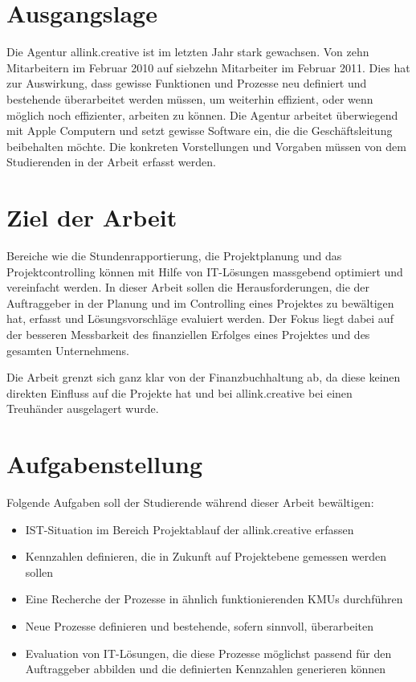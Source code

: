 \section{Ausgangslage}
Die Agentur allink.creative ist im letzten Jahr stark gewachsen. Von zehn
Mitarbeitern im Februar 2010 auf siebzehn Mitarbeiter im Februar 2011. Dies hat 
zur Auswirkung, dass gewisse Funktionen und Prozesse neu definiert und bestehende
überarbeitet werden müssen, um weiterhin effizient, oder wenn möglich noch 
effizienter, arbeiten zu können. Die Agentur arbeitet überwiegend mit Apple
Computern und setzt gewisse Software ein, die die Geschäftsleitung beibehalten 
möchte. Die konkreten Vorstellungen und Vorgaben müssen von dem Studierenden
in der Arbeit erfasst werden.

\section{Ziel der Arbeit}
Bereiche wie die Stundenrapportierung, die Projektplanung und das Projektcontrolling 
können mit Hilfe von IT-Lösungen massgebend optimiert und vereinfacht werden. 
In dieser Arbeit sollen die Herausforderungen, die der Auftraggeber in der 
Planung und im Controlling eines Projektes zu bewältigen hat, erfasst und 
Lösungsvorschläge evaluiert werden. Der Fokus liegt dabei auf der besseren 
Messbarkeit des finanziellen Erfolges eines Projektes und des gesamten 
Unternehmens.

Die Arbeit grenzt sich ganz klar von der Finanzbuchhaltung ab, da
diese keinen direkten Einfluss auf die Projekte hat und bei allink.creative 
bei einen Treuhänder ausgelagert wurde.

\section{Aufgabenstellung}
Folgende Aufgaben soll der Studierende während dieser Arbeit bewältigen:

\begin{itemize}
    \item IST-Situation im Bereich Projektablauf der allink.creative erfassen
    \item Kennzahlen definieren, die in Zukunft auf Projektebene gemessen 
        werden sollen
    \item Eine Recherche der Prozesse in ähnlich funktionierenden KMUs durchführen
    \item Neue Prozesse definieren und bestehende, sofern sinnvoll, überarbeiten
    \item Evaluation von IT-Lösungen, die diese Prozesse möglichst passend 
        für den Auftraggeber abbilden und die definierten Kennzahlen generieren können
\end{itemize}


